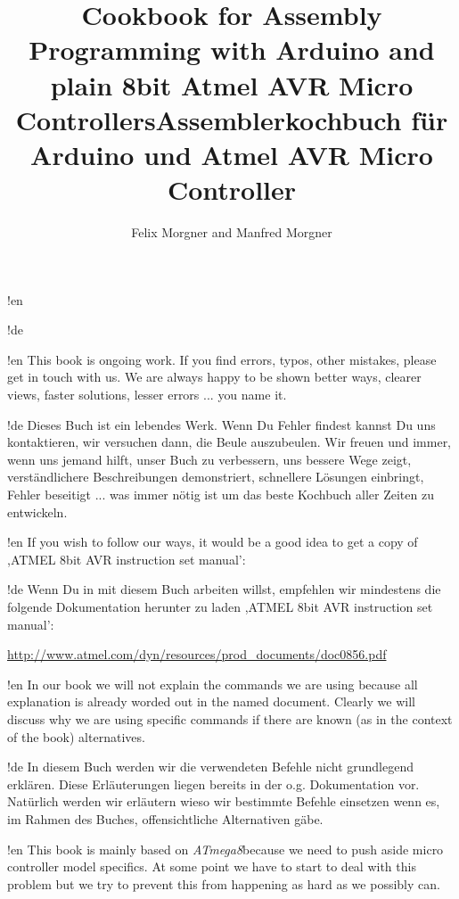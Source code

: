 \documentclass[twoside,12pt,authoryear,openright]{book}
\newcommand{\at}{\textit{ATmega8}}
\begin{document}

!en \title{Cookbook for Assembly Programming with Arduino and plain 8bit Atmel AVR Micro Controllers}
!de \title{Assemblerkochbuch für Arduino und Atmel AVR Micro Controller}

\author{Felix Morgner and Manfred Morgner}


\maketitle

!en This book is ongoing work. If you find errors, typos, other mistakes, please get in touch with us. We are always happy to be shown better ways, clearer views, faster solutions, lesser errors ... you name it.

!de Dieses Buch ist ein lebendes Werk. Wenn Du Fehler findest kannst Du uns kontaktieren, wir versuchen dann, die Beule auszubeulen. Wir freuen und immer, wenn uns jemand hilft, unser Buch zu verbessern, uns bessere Wege zeigt, verständlichere Beschreibungen demonstriert, schnellere Lösungen einbringt, Fehler beseitigt ... was immer nötig ist um das beste Kochbuch aller Zeiten zu entwickeln.



!en If you wish to follow our ways, it would be a good idea to get a copy of ,ATMEL 8bit AVR instruction set manual':

!de Wenn Du in mit diesem Buch arbeiten willst, empfehlen wir mindestens die folgende Dokumentation herunter zu laden ,ATMEL 8bit AVR instruction set manual':

\url{http://www.atmel.com/dyn/resources/prod_documents/doc0856.pdf}



!en In our book we will not explain the commands we are using because all explanation is already worded out in the named document. Clearly we will discuss why we are using specific commands if there are known (as in the context of the book) alternatives.

!de In diesem Buch werden wir die verwendeten Befehle nicht grundlegend erklären. Diese Erläuterungen liegen bereits in der o.g. Dokumentation vor. Natürlich werden wir erläutern wieso wir bestimmte Befehle einsetzen wenn es, im Rahmen des Buches, offensichtliche Alternativen gäbe.



!en This book is mainly based on \at because we need to push aside micro controller model specifics. At some point we have to start to deal with this problem but we try to prevent this from happening as hard as we possibly can.
\end{document}
